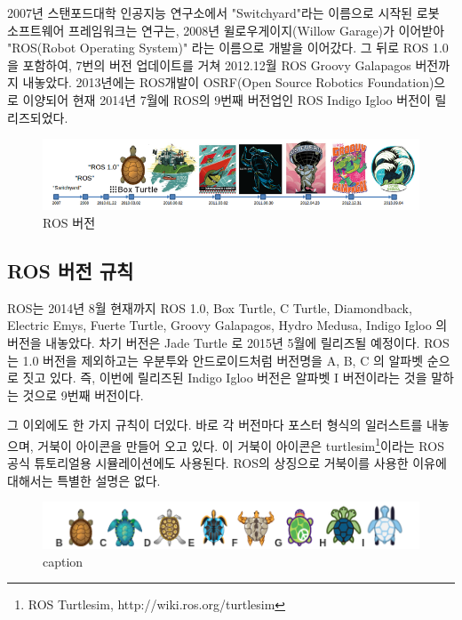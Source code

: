 2007년 스탠포드대학 인공지능 연구소에서 "Switchyard"라는 이름으로 시작된 로봇 소프트웨어 프레임워크는 연구는, 2008년 윌로우게이지(Willow Garage)가 이어받아 "ROS(Robot Operating System)" 라는 이름으로 개발을 이어갔다. 그 뒤로 ROS 1.0을 포함하여, 7번의 버전 업데이트를 거쳐 2012.12월 ROS Groovy Galapagos 버전까지 내놓았다. 2013년에는 ROS개발이 OSRF(Open Source Robotics Foundation)으로 이양되어 현재 2014년 7월에 ROS의 9번째 버전업인 ROS Indigo Igloo 버전이 릴리즈되었다. 

\begin{figure}[h]
\centering\includegraphics[width=0.5\columnwidth]{pictures/chapter1/2013rosversion.png}
\caption{ROS 버전}
\end{figure}

\subsection{ROS 버전 규칙}

ROS는 2014년 8월 현재까지 ROS 1.0, Box Turtle, C Turtle, Diamondback, Electric Emys, Fuerte Turtle, Groovy Galapagos, Hydro Medusa, Indigo Igloo 의 버전을 내놓았다. 차기 버전은 Jade Turtle 로 2015년 5월에 릴리즈될 예정이다. ROS는 1.0 버전을 제외하고는 우분투와 안드로이드처럼 버전명을 A, B, C 의 알파벳 순으로 짓고 있다. 즉, 이번에 릴리즈된 Indigo Igloo 버전은 알파벳 I 버전이라는 것을 말하는 것으로 9번째 버전이다.

그 이외에도 한 가지 규칙이 더있다. 바로 각 버전마다 포스터 형식의 일러스트를 내놓으며, 거북이 아이콘을 만들어 오고 있다. 이 거북이 아이콘은 turtlesim\footnote{ROS Turtlesim, http://wiki.ros.org/turtlesim}이라는 ROS 공식 튜토리얼용 시뮬레이션에도 사용된다. ROS의 상징으로 거북이를 사용한 이유에 대해서는 특별한 설명은 없다.

\begin{figure}[h]
\centering\includegraphics[width=0.5\columnwidth]{pictures/chapter1/ros_turtle_icon.png}
\caption{caption}
\end{figure}

